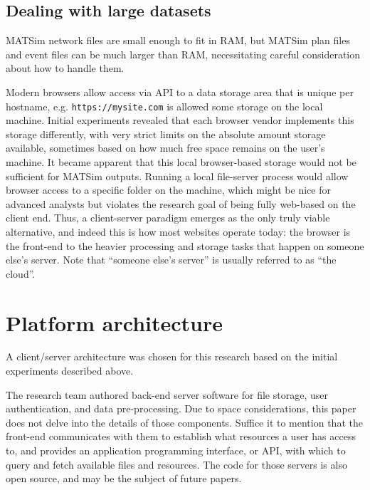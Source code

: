\hypertarget{dealing-with-large-datasets}{%
\subsection{Dealing with large datasets}\label{dealing-with-large-datasets}}

MATSim network files are small enough to fit in RAM, but MATSim plan files and event files can be much larger than RAM, necessitating careful consideration about how to handle them.

Modern browsers allow access via API to a data storage area that is unique per hostname, e.g. \texttt{https://mysite.com} is allowed some storage on the local machine. Initial experiments revealed that each browser vendor implements this storage differently, with very strict limits on the absolute amount storage available, sometimes based on how much free space remains on the user's machine. It became apparent that this local browser-based storage would not be sufficient for MATSim outputs. Running a local file-server process would allow browser access to a specific folder on the machine, which might be nice for advanced analysts but violates the research goal of being fully web-based on the client end. Thus, a client-server paradigm emerges as the only truly viable alternative, and indeed this is how most websites operate today: the browser is the front-end to the heavier processing and storage tasks that happen on someone else's server. Note that ``someone else's server'' is usually referred to as ``the cloud''.

\hypertarget{mathub-platform-architecture}{%
\section{Platform architecture}\label{platform-architecture}}

A client/server architecture was chosen for this research based on the initial experiments described above.

The research team authored back-end server software for file storage, user authentication, and data pre-processing. Due to space considerations, this paper does not delve into the details of those components. Suffice it to mention that the front-end communicates with them to establish what resources a user has access to, and provides an application programming interface, or API, with which to query and fetch available files and resources. The code for those servers is also open source, and may be the subject of future papers.

